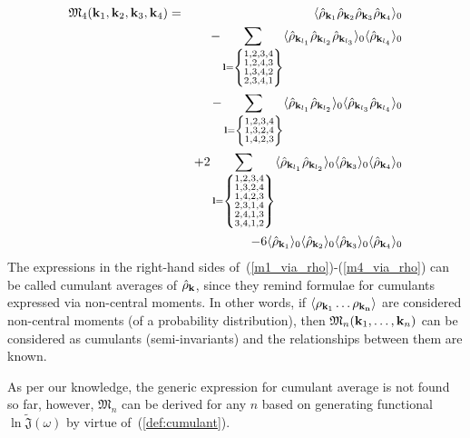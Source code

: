 \begin{eqnarray}
	\label{m4_via_rho}
	\mathfrak{M}_4(\vb k_1, \vb k_2, \vb k_3, \vb k_4) &=& 
	\langle \hat{\rho}_{\vb k_1} \hat{\rho}_{\vb k_2} \hat{\rho}_{\vb k_3} \hat{\rho}_{\vb k_4} \rangle_0 
	\nonumber\\
	&& - \sum_{\vb l = \left\{\substack{1,2,3,4 \\ 1,2,4,3 \\ 1,3,4,2 \\ 2,3,4,1}\right\}} 
	\langle \hat{\rho}_{\vb k_{l_1}} \hat{\rho}_{\vb k_{l_2}} \hat{\rho}_{\vb k_{l_3}} \rangle_0 \langle \hat{\rho}_{\vb k_{l_4}} \rangle_0
	\nonumber\\
	&&-\sum_{\vb l = \left\{\substack{1,2,3,4 \\ 1,3,2,4 \\ 1,4,2,3 }\right\} } \langle \hat{\rho}_{\vb k_{l_1}} \hat{\rho}_{\vb k_{l_2}} \rangle_0 \langle \hat{\rho}_{\vb k_{l_3}} \hat{\rho}_{\vb k_{l_4}} \rangle_0 
	\nonumber\\
	&& +2 \sum_{\vb l = \left\{\substack{1,2,3,4 \\ 1,3,2,4 \\ 1,4,2,3 \\ 2,3,1,4 \\ 2,4,1,3 \\ 3,4,1,2 }\right\} } \langle \hat{\rho}_{\vb k_{l_1}} \hat{\rho}_{\vb k_{l_2}} \rangle_0 \langle\hat{\rho}_{\vb k_3} \rangle_0 \langle\hat{\rho}_{\vb k_4} \rangle_0
	\nonumber\\
	&& -6 \langle \hat{\rho}_{\vb k_1} \rangle_0 \langle\hat{\rho}_{\vb k_2} \rangle_0 \langle\hat{\rho}_{\vb k_3} \rangle_0 \langle\hat{\rho}_{\vb k_4} \rangle_0
\end{eqnarray}
The expressions in the right-hand sides of~(\ref{m1_via_rho})-(\ref{m4_via_rho}) can be called cumulant averages of $\hat{\rho}_{\vb k}$, since they remind formulae for cumulants expressed via non-central moments. In other words, if $\langle\rho_{\vb k_1} \dotsc \rho_{\bf k_n} \rangle$ are considered non-central moments (of a probability distribution), then $\mathfrak{M}_n(\vb k_1, \dotsc, \vb k_n)$ can be considered as cumulants (semi-invariants) and the relationships between them are known\cite{stuart2010kendall}.

As per our knowledge, the generic expression for cumulant average is not found so far, however, $\mathfrak{M}_n$ can be derived for any $n$ based on generating functional $\ln \tilde{\mathfrak{J}}(\omega)$ by virtue of~(\ref{def:cumulant}).

